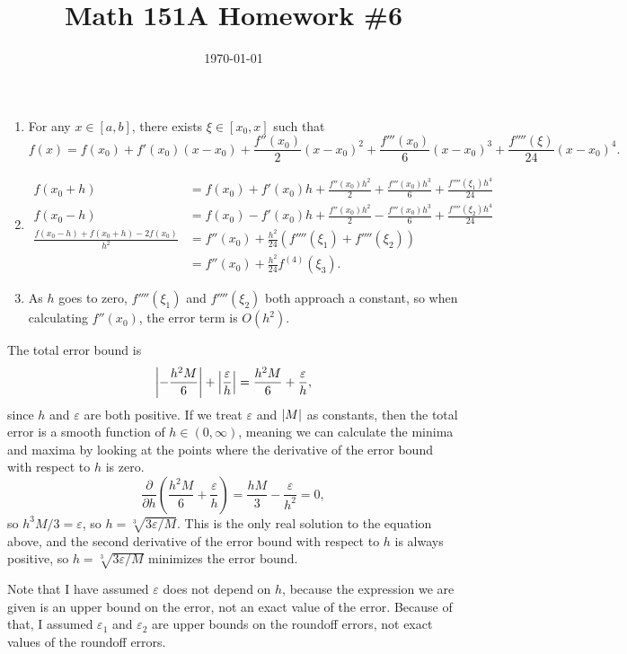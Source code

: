 \documentclass{article}
\date{\today}
\title{Math 151A Homework \#6}
\begin{document}
\maketitle

\begin{prob}
\end{prob}
\begin{enumerate}[label=(\alph*)]
    \item For any $x \in [a,b]$, there exists $\xi \in [x_0, x]$ such that
        \[ f(x) = f(x_0) + f'(x_0)(x-x_0) + \frac{f''(x_0)}{2} (x-x_0)^2 + \frac{f'''(x_0)}{6} (x-x_0)^3 + \frac{f''''(\xi)}{24} (x-x_0)^4. \]
    \item \begin{align*}
        f(x_0+h) &= f(x_0) + f'(x_0)h + \frac{f''(x_0)h^2}{2} + \frac{f'''(x_0)h^3}{6} + \frac{f''''(\xi_1)h^4}{24} \\
        f(x_0-h) &= f(x_0) - f'(x_0)h + \frac{f''(x_0)h^2}{2} - \frac{f'''(x_0)h^3}{6} + \frac{f''''(\xi_2)h^4}{24} \\
        \frac{f(x_0-h)+f(x_0+h)-2f(x_0)}{h^2} &= f''(x_0)+ \frac{h^2}{24} \left( f''''(\xi_1) + f''''(\xi_2) \right) \\
                                              &= f''(x_0) + \frac{h^2}{24} f^{(4)}(\xi_3).
    \end{align*}
\item As $h$ goes to zero, $f''''(\xi_1)$ and $f''''(\xi_2)$ both approach a constant, so when calculating $f''(x_0)$, the error term is $O(h^2)$.
\end{enumerate}

\bigskip
\begin{prob}
\end{prob}
The total error bound is
\[ \left\lvert  - \frac{h^2M}{6}  \right\rvert + \left\lvert  \frac{\varepsilon}{h}  \right\rvert = \frac{h^2 M}{6} + \frac{\varepsilon}{h}, \]
since $h$ and $\varepsilon$ are both positive. If we treat $\varepsilon$ and $\left\lvert M \right\rvert$ as constants, then the total error is a smooth function of $h \in (0, \infty)$, meaning we can calculate the minima and maxima by looking at the points where the derivative of the error bound with respect to $h$ is zero.
\[ \frac{\partial}{\partial h} \left( \frac{h^2 M}{6} + \frac{\varepsilon}{h} \right) = \frac{h M}{3} - \frac{\varepsilon}{h^2} = 0, \]
so $h^3 M/3 = \varepsilon$, so $h = \sqrt[3]{3 \varepsilon / M}$. This is the only real solution to the equation above, and the second derivative of the error bound with respect to $h$ is always positive, so $h = \sqrt[3]{3 \varepsilon / M}$ minimizes the error bound.
\par
Note that I have assumed $\varepsilon$ does not depend on $h$, because the expression we are given is an upper bound on the error, not an exact value of the error. Because of that, I assumed $\varepsilon_1$ and $\varepsilon_2$ are upper bounds on the roundoff errors, not exact values of the roundoff errors.
\end{document}
